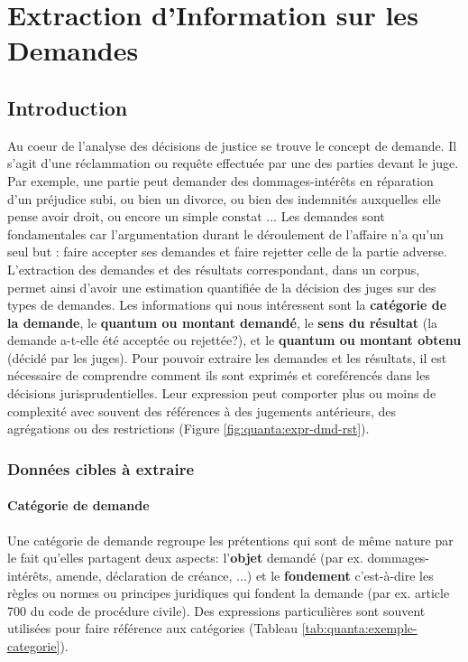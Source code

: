 %
\chapter{Extraction d'Information sur les Demandes}
\label{sec:quanta}

\section{Introduction}
\label{sec:quanta:introduction}
Au coeur de l'analyse des décisions de justice se trouve le concept de demande. Il s'agit d'une réclammation ou requête effectuée par une des parties devant le juge. Par exemple, une partie peut demander des dommages-intérêts en réparation d'un préjudice subi, ou bien un divorce, ou bien des indemnités auxquelles elle pense avoir droit, ou encore un simple constat ... Les demandes sont fondamentales car l'argumentation durant le déroulement de l'affaire n'a qu'un seul but : faire accepter ses demandes et faire rejetter celle de la partie adverse. L'extraction des demandes et des résultats correspondant, dans un corpus, permet ainsi d'avoir une estimation quantifiée de la décision des juges sur des types de demandes. Les informations qui nous intéressent sont la \textbf{catégorie de la demande}, le \textbf{quantum ou montant demandé}, le \textbf{sens du résultat} (la demande a-t-elle été acceptée ou rejettée?), et le \textbf{quantum ou montant obtenu} (décidé par les juges). Pour pouvoir extraire les demandes et les résultats, il est nécessaire de comprendre comment ils sont exprimés et coreférencés dans les décisions jurisprudentielles. Leur expression peut comporter plus ou moins de complexité avec souvent des références à des jugements antérieurs, des agrégations ou des restrictions (Figure \ref{fig:quanta:expr-dmd-rst}).

\subsection{Données cibles à extraire}
\subsubsection{Catégorie de demande}
Une catégorie de demande regroupe les prétentions qui sont de même nature par le fait qu'elles partagent deux aspects: l'\textbf{objet} demandé (par ex. dommages-intérêts, amende, déclaration de créance, ...) et le \textbf{fondement} c'est-à-dire les règles ou normes ou principes juridiques qui fondent la demande (par ex. article 700 du code de procédure civile). Des expressions particulières sont souvent utilisées pour faire référence aux catégories (Tableau \ref{tab:quanta:exemple-categorie}).

